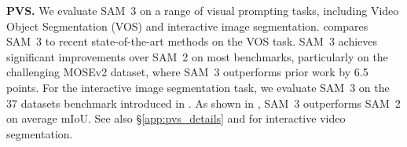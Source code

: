 \documentclass[]{fairmeta}
\newcommand{\samtwo}{SAM~2\xspace}
\newcommand{\model}{SAM~3\xspace}
\renewcommand{\paragraph}[1]{%
	\noindent\textbf{#1.}\noindent\xspace%
}
\begin{document}
	
	\paragraph{PVS} We evaluate \model on a range of visual prompting tasks, including Video Object Segmentation (VOS) and interactive image segmentation.  compares \model to recent %
	state-of-the-art methods on the VOS task. \model achieves significant improvements over \samtwo on most benchmarks, particularly on the challenging MOSEv2 dataset, where \model outperforms prior work by 6.5 points.
	For the interactive image segmentation task, we evaluate \model on the 37 datasets benchmark introduced in \cite{sam2}. As shown in , \model outperforms \samtwo on average $\mathrm{mIoU}$. See also \S\ref{app:pvs_details} and  for interactive video segmentation.
	
\end{document}
